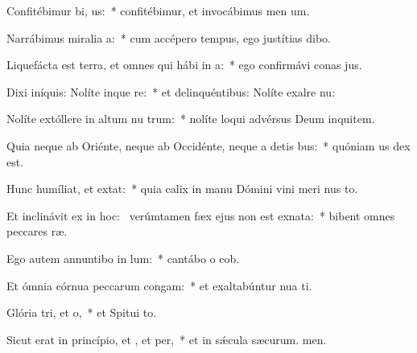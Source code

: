 \item Confitébimur bi, us:~* confitébimur, et invocábimus men um.
\item Narrábimus miralia a:~* cum accépero tempus, ego justítias dibo.
\item Liquefácta est terra, et omnes qui hábi in a:~* ego confirmávi conas jus.
\item Dixi iníquis: Nolíte inque re:~* et delinquéntibus: Nolíte exalre nu:
\item Nolíte extóllere in altum nu trum:~* nolíte loqui advérsus Deum inquitem.
\item Quia neque ab Oriénte, neque ab Occidénte, neque a detis bus:~* quóniam us dex est.
\item Hunc humíliat, et  extat:~* quia calix in manu Dómini vini meri nus to.
\item Et inclinávit ex  in hoc:~\pscross{} verúmtamen fæx ejus non est exnata:~* bibent omnes peccares ræ.
\item Ego autem annuntibo in lum:~* cantábo o cob.
\item Et ómnia córnua peccarum congam:~* et exaltabúntur nua ti.
\item Glória tri, et o,~* et Spitui to.
\item Sicut erat in princípio, et , et per,~* et in sǽcula sæcurum. men.

